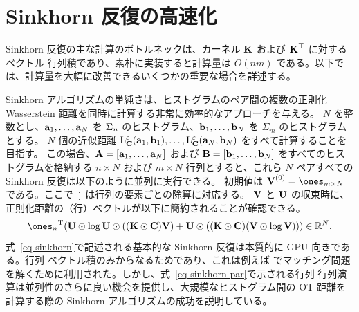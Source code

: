 \section{Sinkhorn 反復の高速化}

Sinkhorn 反復の主な計算のボトルネックは、カーネル $\mathrm{\textbf{K}}$ および $\mathrm{\textbf{K}}^\top$ に対するベクトル-行列積であり、素朴に実装すると計算量は $O(nm)$ である。以下では、計算量を大幅に改善できるいくつかの重要な場合を詳述する。

\begin{rem}\label{rem-parallel} Sinkhorn アルゴリズムの単純さは、ヒストグラムのペア間の複数の正則化 Wasserstein 距離を同時に計算する非常に効率的なアプローチを与える。
$N$ を整数とし、$\mathrm{\textbf{a}}_1,\ldots,\mathrm{\textbf{a}}_N$ を $\Sigma_n$ のヒストグラム、$\mathrm{\textbf{b}}_1,\ldots,\mathrm{\textbf{b}}_N$ を $\Sigma_m$ のヒストグラムとする。
$N$ 個の近似距離 $\mathrm{L}_{\mathrm{\textbf{C}}}^\varepsilon(\mathrm{\textbf{a}}_1,\mathrm{\textbf{b}}_1),\dots,\mathrm{L}_{\mathrm{\textbf{C}}}^\varepsilon(\mathrm{\textbf{a}}_N,\mathrm{\textbf{b}}_N)$ をすべて計算することを目指す。
この場合、$\mathrm{\textbf{A}}=[\mathrm{\textbf{a}}_1,\dots,\mathrm{\textbf{a}}_N]$ および $\mathrm{\textbf{B}}=[\mathrm{\textbf{b}}_1,\dots,\mathrm{\textbf{b}}_N]$ をすべてのヒストグラムを格納する $n\times N$ および $m\times N$ 行列とすると、これら $N$ ペアすべての Sinkhorn 反復は以下のように並列に実行できる。
\eql{\label{eq-sinkhorn-par}
	\itt{\UD} \eqdef \frac{\A}{\K \it{\VD}}
	\qandq
	\itt{\VD} \eqdef \frac{\B}{\transp{\K}\itt{\UD}},
}
初期値は $\init{\VD} = \ones_{m \times N}$ である。ここで $\frac{\cdot}{\cdot}$ は行列の要素ごとの除算に対応する。
$\mathrm{\textbf{V}}$ と $\mathrm{\textbf{U}}$ の収束時に、正則化距離の（行）ベクトルが以下に簡約されることが確認できる。
$$ \transp{\ones_n} (    \UD\odot \log \UD \odot (   (\K\odot \C) \VD) +  \UD\odot(   (\K\odot \C)(\VD\odot \log \VD)    ) ) \in\RR^{N}.$$
式~\eqref{eq-sinkhorn}で記述される基本的な Sinkhorn 反復は本質的に GPU 向きである。行列-ベクトル積のみからなるためであり、これは例えば \citet{slomp2011gpu} でマッチング問題を解くために利用された。しかし、式~\eqref{eq-sinkhorn-par}で示される行列-行列演算は並列性のさらに良い機会を提供し、大規模なヒストグラム間の OT 距離を計算する際の Sinkhorn アルゴリズムの成功を説明している。
\end{rem}

